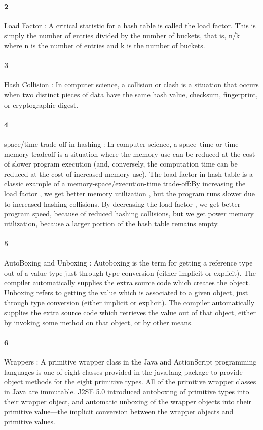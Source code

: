 \documentclass{article}
\begin{document}
\paragraph{2}
Load Factor : A critical statistic for a hash table is called the load factor. This is simply the number of entries divided by the number of buckets, that is, n/k where n is the number of entries and k is the number of buckets.
\paragraph{3}
Hash Collision : In computer science, a collision or clash is a situation that occurs when two distinct pieces of data have the same hash value, checksum, fingerprint, or cryptographic digest.
\paragraph{4}
space/time trade-off in hashing : In computer science, a space–time or time–memory tradeoff is a situation where the memory use can be reduced at the cost of slower program execution (and, conversely, the computation time can be reduced at the cost of increased memory use). The load factor in hash table is a classic example of a memory-space/execution-time trade-off:By increasing the load factor , we get better memory utilization , but the program runs slower due to increased hashing collisions. By decreasing the load factor , we get better program speed, because of reduced hashing collisions, but we get power memory utilization, because a larger portion of the hash table remains empty.
\paragraph{5}
AutoBoxing and Unboxing : Autoboxing is the term for getting a reference type out of a value type just through type conversion (either implicit or explicit). The compiler automatically supplies the extra source code which creates the object.
\newline
Unboxing refers to getting the value which is associated to a given object, just through type conversion (either implicit or explicit). The compiler automatically supplies the extra source code which retrieves the value out of that object, either by invoking some method on that object, or by other means.
\paragraph{6}
Wrappers : A primitive wrapper class in the Java and ActionScript programming languages is one of eight classes provided in the java.lang package to provide object methods for the eight primitive types. All of the primitive wrapper classes in Java are immutable. J2SE 5.0 introduced autoboxing of primitive types into their wrapper object, and automatic unboxing of the wrapper objects into their primitive value—the implicit conversion between the wrapper objects and primitive values.
\end{document}
